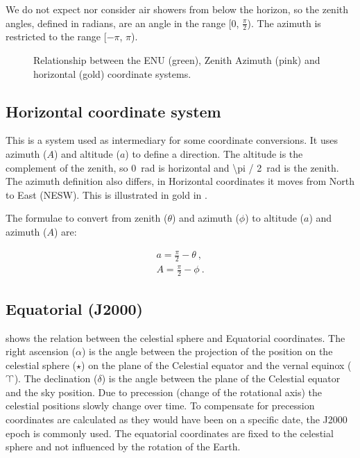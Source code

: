 We do not expect nor consider air showers from below the horizon, so the
zenith angles, defined in radians, are an angle in the range [0,
$\frac{\pi}{2}$). The azimuth is restricted to the range [$-\pi$, $\pi$).

\begin{figure}
    \centering
    
    \caption{Relationship between the ENU (green), Zenith Azimuth (pink)
             and horizontal (gold) coordinate systems.}
    \label{fig:enu_horizontal}
\end{figure}


\subsection{Horizontal coordinate system}

This is a system used as intermediary for some coordinate conversions.
It uses azimuth ($A$) and altitude ($a$) to define a direction. The
altitude is the complement of the zenith, so \SI{0}{\radian} is horizontal
and \SI{\pi / 2}{\radian} is the zenith. The azimuth definition also
differs, in Horizontal coordinates it moves from North to East (NESW).
This is illustrated in gold in .

The formulae to convert from zenith ($\theta$) and azimuth ($\phi$) to
altitude ($a$) and azimuth ($A$) are:

\begin{equation}
    \begin{array}{l}
        a = \frac{\pi}{2} - \theta \ , \\
        A = \frac{\pi}{2} - \phi \ .
    \end{array}
\end{equation}


\subsection{Equatorial (J2000)}

 shows the relation between the celestial sphere
and Equatorial coordinates. The right ascension ($\alpha$) is the angle
between the projection of the position on the celestial sphere ($\star$)
on the plane of the Celestial equator and the vernal equinox
($\vernal$). The declination ($\delta$) is the angle between the plane
of the Celestial equator and the sky position. Due to precession (change
of the rotational axis) the celestial positions slowly change over time.
To compensate for precession coordinates are calculated as they would
have been on a specific date, the J2000 epoch is commonly used. The
equatorial coordinates are fixed to the celestial sphere and not
influenced by the rotation of the Earth.

